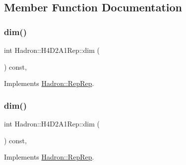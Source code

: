 \subsection{Member Function Documentation}
\mbox{\label{structHadron_1_1H4D2A1Rep_ae600fd0e83fd097e98797656ed4371e5}} 
\subsubsection{\texorpdfstring{dim()}{dim()}\hspace{0.1cm}{\footnotesize\ttfamily [1/5]}}
{\footnotesize\ttfamily int Hadron\+::\+H4\+D2\+A1\+Rep\+::dim (\begin{DoxyParamCaption}{ }\end{DoxyParamCaption}) const\hspace{0.3cm}{\ttfamily [inline]}, {\ttfamily [virtual]}}



Implements \mbox{\hyperlink{structHadron_1_1RepRep_a92c8802e5ed7afd7da43ccfd5b7cd92b}{Hadron\+::\+Rep\+Rep}}.

\mbox{\label{structHadron_1_1H4D2A1Rep_ae600fd0e83fd097e98797656ed4371e5}} 
\subsubsection{\texorpdfstring{dim()}{dim()}\hspace{0.1cm}{\footnotesize\ttfamily [2/5]}}
{\footnotesize\ttfamily int Hadron\+::\+H4\+D2\+A1\+Rep\+::dim (\begin{DoxyParamCaption}{ }\end{DoxyParamCaption}) const\hspace{0.3cm}{\ttfamily [inline]}, {\ttfamily [virtual]}}



Implements \mbox{\hyperlink{structHadron_1_1RepRep_a92c8802e5ed7afd7da43ccfd5b7cd92b}{Hadron\+::\+Rep\+Rep}}.

\mbox{\label{structHadron_1_1H4D2A1Rep_ae600fd0e83fd097e98797656ed4371e5}} 
